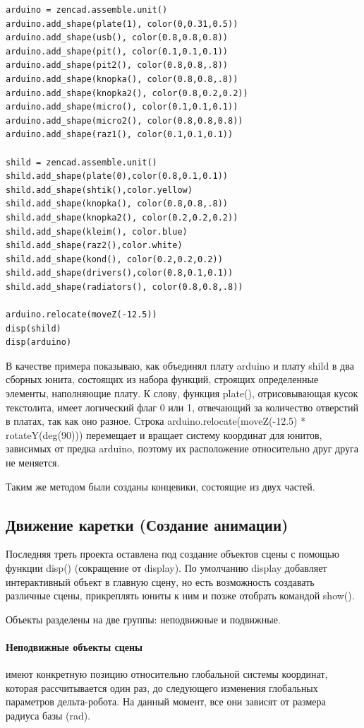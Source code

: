  \begin{lstlisting}[style=python,caption=Пример сборочного юнита]
arduino = zencad.assemble.unit()
arduino.add_shape(plate(1), color(0,0.31,0.5))
arduino.add_shape(usb(), color(0.8,0.8,0.8))
arduino.add_shape(pit(), color(0.1,0.1,0.1))
arduino.add_shape(pit2(), color(0.8,0.8,.8))
arduino.add_shape(knopka(), color(0.8,0.8,.8))
arduino.add_shape(knopka2(), color(0.8,0.2,0.2))
arduino.add_shape(micro(), color(0.1,0.1,0.1))
arduino.add_shape(micro2(), color(0.8,0.8,0.8))
arduino.add_shape(raz1(), color(0.1,0.1,0.1))

shild = zencad.assemble.unit()
shild.add_shape(plate(0),color(0.8,0.1,0.1))
shild.add_shape(shtik(),color.yellow)
shild.add_shape(knopka(), color(0.8,0.8,.8))
shild.add_shape(knopka2(), color(0.2,0.2,0.2))
shild.add_shape(kleim(), color.blue)
shild.add_shape(raz2(),color.white)
shild.add_shape(kond(), color(0.2,0.2,0.2))
shild.add_shape(drivers(),color(0.8,0.1,0.1))
shild.add_shape(radiators(), color(0.8,0.8,.8))

arduino.relocate(moveZ(-12.5))
disp(shild)
disp(arduino)
\end{lstlisting}

В качестве примера показываю, как объединял плату arduino и плату shild  в два сборных юнита, состоящих из набора функций, строящих определенные элементы, наполняющие плату. К слову, функция plate(), отрисовывающая кусок текстолита, имеет логический флаг 0 или 1, отвечающий за количество отверстий в платах, так как оно разное. Строка arduino.relocate(moveZ(-12.5) * rotateY(deg(90))) перемещает  и вращает систему координат для юнитов, зависимых от предка arduino, поэтому их расположение относительно друг друга не меняется.  

Таким же методом были созданы концевики, состоящие из двух частей. 

\subsection{Движение каретки (Создание анимации)}

Последняя треть проекта оставлена под создание объектов сцены с помощью функции disp() (сокращение от display). По умолчанию display добавляет интерактивный объект в главную сцену, но есть возможность создавать различные сцены, прикреплять юниты к ним и позже отобрать командой show(). 

Объекты разделены на две группы: неподвижные и подвижные.
\paragraph{Неподвижные объекты сцены} имеют конкретную позицию относительно глобальной системы координат, которая рассчитывается один раз, до следующего изменения глобальных параметров дельта-робота. На данный момент, все они зависят от размера радиуса базы (rad). 

